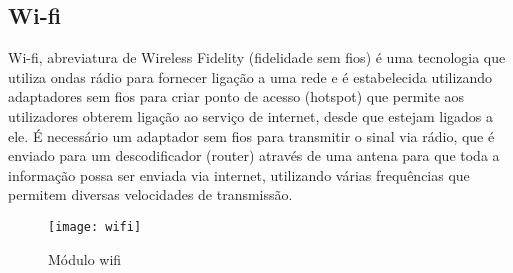 \subsection{Wi-fi}
\label{subsec:wi-fi}
		Wi-fi, abreviatura de Wireless Fidelity (fidelidade sem fios) é uma tecnologia que utiliza ondas rádio para fornecer ligação a uma rede e é estabelecida utilizando adaptadores sem fios para criar ponto de acesso (hotspot) que permite aos utilizadores obterem ligação ao serviço de internet, desde que estejam ligados a ele. É necessário um adaptador sem fios para transmitir o sinal via rádio, que é enviado para um descodificador (router) através de uma antena para que toda a informação possa ser enviada via internet, utilizando várias frequências que permitem diversas velocidades de transmissão.
\begin{figure}[htbp]
	\centering
	\texttt{[image: wifi]}
	\caption{Módulo wifi}
	\label{fig:modulo_wifi}
\end{figure}